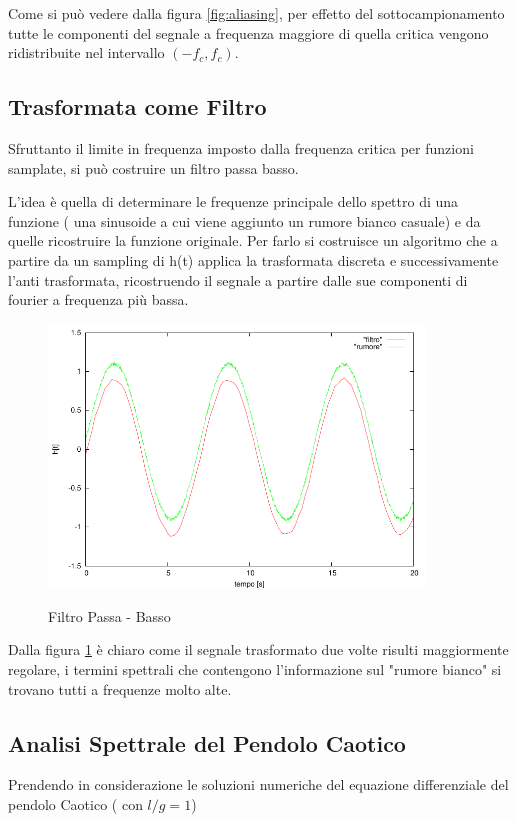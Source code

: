 \documentclass[13pt]{article}
\begin{document}
Come si può vedere dalla figura \ref{fig:aliasing}, per effetto del sottocampionamento tutte le componenti del segnale a frequenza maggiore di quella critica vengono ridistribuite nel intervallo $(-f_{c} , f_{c} )$.


\subsection{Trasformata come Filtro}

Sfruttanto il limite in frequenza imposto dalla frequenza critica per funzioni samplate, si può costruire un filtro passa basso.

L'idea è quella di determinare le frequenze principale dello spettro di una funzione ( una sinusoide a cui viene aggiunto un rumore bianco casuale) e da quelle ricostruire la funzione originale.
Per farlo si costruisce un algoritmo che a partire da un sampling di h(t) applica la trasformata discreta e successivamente l'anti trasformata, ricostruendo il segnale a partire dalle sue componenti di fourier a frequenza più bassa.
\begin{figure}[!h]
\caption{Filtro Passa - Basso}
\includegraphics[width=10cm,keepaspectratio]{picture/filtrazione}
\centering
\label{fig:filtrazione}
\end{figure}

Dalla figura \ref{fig:filtrazione} è chiaro come il segnale trasformato due volte risulti maggiormente regolare, i termini spettrali che contengono l'informazione sul "rumore bianco" si trovano tutti a frequenze molto alte.

\subsection{Analisi Spettrale del Pendolo Caotico}

Prendendo in considerazione le soluzioni numeriche del equazione differenziale del pendolo Caotico ( con $l/g = 1$)
\end{document}
